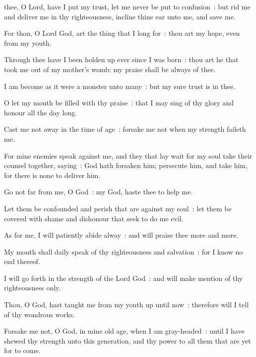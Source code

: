 thee, O Lord, have I put my trust, let me never be put to confusion~: but rid me and deliver me in thy righteousness, incline thine ear unto me, and save me.\par
{}
For thou, O Lord God, art the thing that I long for~: thou art my hope, even from my youth.\par
{}Through thee have I been holden up ever since I was born~: thou art he that took me out of my mother's womb; my praise shall be always of thee.\par
{}I am become as it were a monster unto many~: but my sure trust is in thee.\par
{}O let my mouth be filled with thy praise~: that I may sing of thy glory and honour all the day long.\par
{}Cast me not away in the time of age~: forsake me not when my strength faileth me.\par
{}For mine enemies speak against me, and they that lay wait for my soul take their counsel together, saying~: God hath forsaken him; persecute him, and take him, for there is none to deliver him.\par
{}Go not far from me, O God~: my God, haste thee to help me.\par
{}Let them be confounded and perish that are against my soul~: let them be covered with shame and dishonour that seek to do me evil.\par
{}As for me, I will patiently abide alway~: and will praise thee more and more.\par
{}My mouth shall daily speak of thy righteousness and salvation~: for I know no end thereof.\par
{}I will go forth in the strength of the Lord God~: and will make mention of thy righteousness only.\par
{}Thou, O God, hast taught me from my youth up until now~: therefore will I tell of thy wondrous works.\par
{}Forsake me not, O God, in mine old age, when I am gray-headed~: until I have shewed thy strength unto this generation, and thy power to all them that are yet for to come.\par
